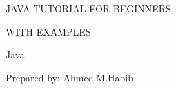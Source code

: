 \pagestyle{fancy}
\begingroup

\par\sffamily\selectfont
\begin{center}
\color{white}
\fontsize{22pt}{0}\selectfont JAVA TUTORIAL FOR BEGINNERS\par
\vspace*{.5cm}
\fontsize{22pt}{0}\selectfont WITH EXAMPLES\par
\vspace*{2.5cm}
\color{cover}
\fontsize{130pt}{0}\selectfont Java\par
\color{white}
\vspace*{13.75cm}
\fontsize{22pt}{0}\selectfont Prepared by: Ahmed.M.Habib\par
\end{center}
\endgroup

